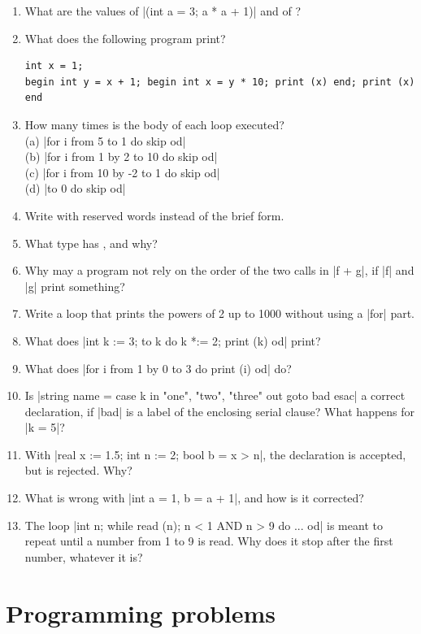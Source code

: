 \begin{enumerate}
\item What are the values of \code|(int a = 3; a * a + 1)| and of
  ?
\item What does the following program print?
\begin{lstlisting}
int x = 1;
begin int y = x + 1; begin int x = y * 10; print (x) end; print (x) end
\end{lstlisting}
\item How many times is the body of each loop executed?\\
  (a) \code|for i from 5 to 1 do skip od|\\
  (b) \code|for i from 1 by 2 to 10 do skip od|\\
  (c) \code|for i from 10 by -2 to 1 do skip od|\\
  (d) \code|to 0 do skip od|
\item Write  with
  reserved words instead of the brief form.
\item What type has , and why?
\item Why may a program not rely on the order of the two calls in
  \code|f + g|, if \code|f| and \code|g| print something?
\item Write a loop that prints the powers of 2 up to 1000 without using a
  \code|for| part.
\item What does \code|int k := 3; to k do k *:= 2; print (k) od| print?
\item What does \code|for i from 1 by 0 to 3 do print (i) od| do?
\item Is \code|string name = case k in "one", "two", "three" out goto bad esac|
  a correct declaration, if \code|bad| is a label of the enclosing serial
  clause? What happens for \code|k = 5|?
\item With \code|real x := 1.5; int n := 2; bool b = x > n|, the declaration
   is accepted, but
   is rejected. Why?
\item What is wrong with \code|int a = 1, b = a + 1|, and how is it
  corrected?
\item The loop \code|int n; while read (n); n < 1 AND n > 9 do ... od| is
  meant to repeat until a number from 1 to 9 is read. Why does it stop
  after the first number, whatever it is?
\end{enumerate}

\section*{Programming problems}

